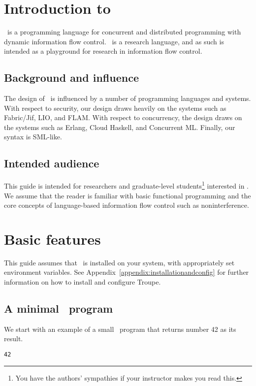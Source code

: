 \section{Introduction to \troupelang}
\troupelang\ is a programming language for concurrent and distributed programming with 
dynamic information flow control. 
\troupelang\ is a research language, and as such is intended as a playground for research in 
information flow control.

\subsection{Background and influence}
The design of \troupelang\ is influenced by a number of programming languages and systems. With respect to 
security, our design draws heavily on the systems such as Fabric/Jif, LIO, and FLAM.
With respect to concurrency, the design draws on the systems such as Erlang, Cloud Haskell, and Concurrent ML.
Finally, our syntax is SML-like.



\subsection{Intended audience}
This guide is intended for researchers and graduate-level students\footnote{You have the authors' sympathies if your instructor makes you read this.} interested in \troupelang.
We assume that the reader is familiar with basic functional programming and the 
core concepts of language-based information flow control such as noninterference.

\section{Basic features}

This guide assumes that \troupelang\ is installed on your system, with appropriately set environment variables.
%
See Appendix~\ref{appendix:installationandconfig} for further 
information on how to install and configure Troupe.


\subsection{A minimal \troupelang\ program}


We start with an example of a small \troupelang\ program that returns number 42 as its result.
\begin{verbatim}
42
\end{verbatim}

